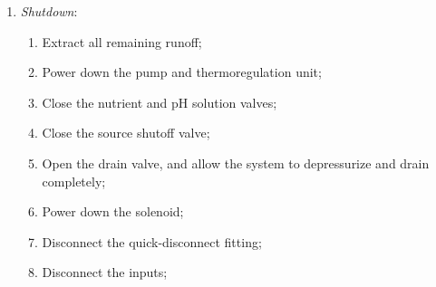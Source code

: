 \documentclass{report}
\begin{document}
\begin{enumerate}
\begin{enumerate}
        \item Nutrient and pH (\ref{sec:nutrientsph}) solutions are mixed in-line at an adjustable ratio (\ref{sec:automation}); \footnote{I.e. add X mL of nutrient solution Y per mL water to achieve Z ppm, or add A mL of pH down solution per mL water to achieve a pH of B.}
        \item Flow to nozzle is controlled (on/off) (\ref{sec:automation});
        \item Nozzle turns pressurized water into mist, which is 98\% more water efficient than traditional farming;
        \item Mist runoff is contained by a container, and extracted for processing as waste water;
    \end{enumerate}
    \item \textit{Shutdown}:
    \begin{enumerate}
        \item Extract all remaining runoff;
        \item Power down the pump and thermoregulation unit;
        \item Close the nutrient and pH solution valves;
        \item Close the source shutoff valve;
        \item Open the drain valve, and allow the system to depressurize and  drain completely;
        \item Power down the solenoid;
        \item Disconnect the quick-disconnect fitting;
        \item Disconnect the inputs;
    \end{enumerate}
\end{enumerate}
\end{document}
